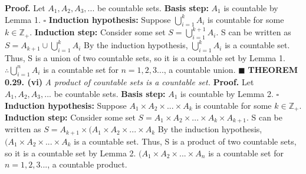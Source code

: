 \documentclass[12pt]{article}
\begin{document}
	\textbf{Proof. } \newline
	Let \(A_1, A_2, A_3,...\) be countable sets. \newline
	\textbf{Basis step: } \(A_1\) is countable by Lemma 1.
	\newline \(\square\) \newline
	\textbf{Induction hypothesis: } Suppose \(\bigcup_{i=1}^{k} A_i\) is countable for some \(k \in \mathbb{Z}_+\). \newline
	\textbf{Induction step: } Consider some set \(S = \bigcup_{i=1}^{k+1} A_i\). \newline \newline
	S can be written as \(S = A_{k+1} \cup \bigcup_{i=1}^{k} A_i\) \newline
	By the induction hypothesis, \(\bigcup_{i=1}^{k} A_i\) is a countable set. Thus, S is a union of two countable sets, so it is a countable set by Lemma 1. \newline \newline
	\(\therefore \bigcup_{i=1}^{n} A_i \) is a countable set for \(n=1,2,3...\), a countable union. \newline
	\(\blacksquare\) \newline \newline
	\textbf{THEOREM 0.29. (vi)} \textit{A product of countable sets is a countable set.} \newline \newline
	\textbf{Proof. } \newline
	Let \(A_1, A_2, A_3,...\) be countable sets. \newline
	\textbf{Basis step: } \(A_1\) is countable by Lemma 2.
	\newline \(\square\) \newline
	\textbf{Induction hypothesis: } Suppose \(A_1 \times A_2 \times ...\times A_k\) is countable for some \(k \in \mathbb{Z}_+\). \newline
	\textbf{Induction step: } Consider some set \(S = A_1 \times A_2 \times ...\times A_k \times A_{k+1}\). \newline \newline
	S can be written as \(S = A_{k+1} \times (A_1 \times A_2 \times ...\times A_k\) \newline
	By the induction hypothesis, \((A_1 \times A_2 \times ...\times A_k\) is a countable set. Thus, S is a product of two countable sets, so it is a countable set by Lemma 2. \newline \newline
	\((A_1 \times A_2 \times ...\times A_n\) is a countable set for \(n=1,2,3...\), a countable product. \newline
\end{document}
